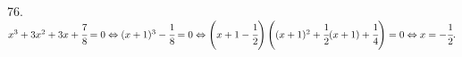 76. $x^3+3x^2+3x+\cfrac{7}{8}=0 \Leftrightarrow (x+1)^3-\cfrac{1}{8}=0\Leftrightarrow \left(x+1-\cfrac{1}{2}\right)\left((x+1)^2+\cfrac{1}{2}(x+1)+\cfrac{1}{4}\right)=0\Leftrightarrow x=-\cfrac{1}{2}.$\\
